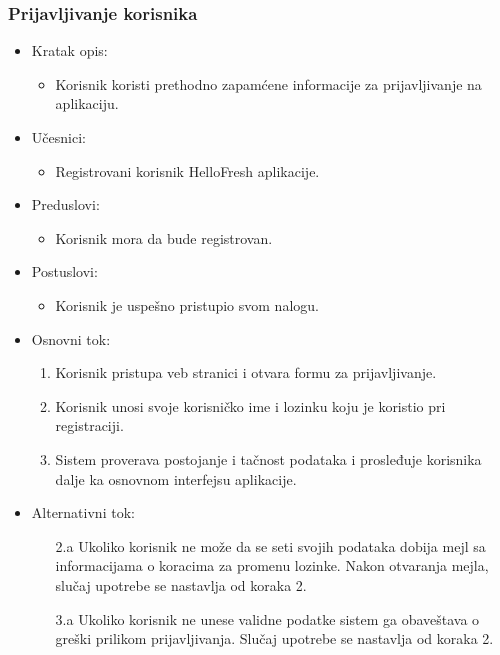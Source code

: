 \subsubsection{Prijavljivanje korisnika}

\begin{itemize}
    \item Kratak opis:
        \begin{itemize}
            \item Korisnik koristi prethodno zapamćene informacije za prijavljivanje na aplikaciju.
        \end{itemize}
    \item Učesnici:
        \begin{itemize}
            \item Registrovani korisnik HelloFresh aplikacije.
        \end{itemize}
    \item Preduslovi:
        \begin{itemize}
            \item Korisnik mora da bude registrovan.
        \end{itemize}
    \item Postuslovi:
        \begin{itemize}
            \item Korisnik je uspešno pristupio svom nalogu.
        \end{itemize}
    \item Osnovni tok:
        \begin{enumerate}
            \item Korisnik pristupa veb stranici i otvara formu za prijavljivanje.
            \item Korisnik unosi svoje korisničko ime i lozinku koju je koristio pri registraciji.
            \item Sistem proverava postojanje i tačnost podataka i prosleđuje korisnika dalje ka osnovnom interfejsu aplikacije.
        \end{enumerate}
    \item Alternativni tok:
        \begin{itemize}
            \item[2.a] Ukoliko korisnik ne može da se seti svojih podataka dobija mejl sa informacijama o koracima za promenu lozinke. Nakon otvaranja mejla, slučaj upotrebe se nastavlja od koraka 2.
			\item[3.a] Ukoliko korisnik ne unese validne podatke sistem ga obaveštava o greški prilikom prijavljivanja. Slučaj upotrebe se nastavlja od koraka 2.

\end{itemize}
\end{itemize}
